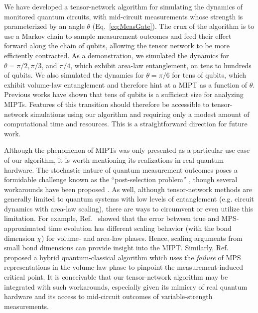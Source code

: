 \documentclass[reprint,amsmath,amssymb,aps, twocolumn, superscriptaddress, prb]{revtex4-2}
\begin{document}
We have developed a tensor-network algorithm for simulating the dynamics of monitored quantum circuits, with mid-circuit measurements whose strength is parameterized by an angle $\theta$ (Eq.~\eqref{eq:MeasGate}). The crux of the algorithm is to use a Markov chain to sample measurement outcomes and feed their effect forward along the chain of qubits, allowing the tensor network to be more efficiently contracted. As a demonstration, we simulated the dynamics for $\theta = \pi/2, \pi/3$, and $\pi/4$, which exhibit area-law entanglement, on tens to hundreds of qubits. We also simulated the dynamics for $\theta=\pi/6$ for tens of qubits, which exhibit volume-law entanglement and therefore hint at a MIPT as a function of $\theta$. Previous works \cite{SzyniszewskiPRB2019,MelkoPRA2021} have shown that tens of qubits is a sufficient size for analyzing MIPTs. Features of this transition should therefore be accessible to tensor-network simulations using our algorithm and requiring only a modest amount of computational time and resources. This is a straightforward direction for future work.

Although the phenomenon of MIPTs was only presented as a particular use case of our algorithm, it is worth mentioning its realizations in real quantum hardware. The stochastic nature of quantum measurement outcomes poses a formidable challenge known as the ``post-selection problem'' \cite{McGinleyPRX2024,GarrattPRX2024}, though several workarounds have been proposed 
\cite{BawejaArxiv2024,FengArxiv2025, BuchholdArxiv2022,KhindanovAnnPhys2025,GarrattPRX2024}. As well, although tensor-network methods are generally limited to quantum systems with low levels of entanglement (e.g. circuit dynamics with area-law scaling), there are ways to circumvent or even utilize this limitation. For example, Ref.~\cite{CecilePhysRevRes2024} showed that the error between true and MPS-approximated time evolution has different scaling behavior (with the bond dimension $\chi$) for volume- and area-law phases. Hence, scaling arguments from small bond dimensions can provide insight into the MIPT. Similarly, Ref.~\cite{YanayPRL2024} proposed a hybrid quantum-classical algorithm which uses the \textit{failure} of MPS representations in the volume-law phase to pinpoint the measurement-induced critical point. It is conceivable that our tensor-network algorithm may be integrated with such workarounds, especially given its mimicry of real quantum hardware and its access to mid-circuit outcomes of variable-strength measurements. 
\end{document}
